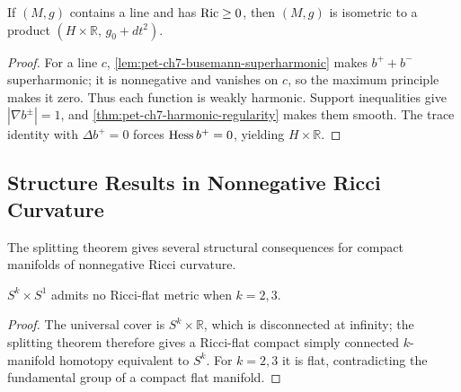 \begin{theorem}
  \label{thm:pet-ch7-splitting-theorem}

  If $(M,g)$ contains a line and has $\operatorname{Ric}\ge0$, then $(M,g)$ is isometric to
  a product $(H\times\mathbb{R},\,g_0+dt^2)$.
\end{theorem}
\begin{proof}
  \sketch
  For a line \(c\), \cref{lem:pet-ch7-busemann-superharmonic} makes \(b^++b^-\) superharmonic; it is nonnegative and vanishes on \(c\), so the maximum principle makes it zero. Thus each function is weakly harmonic. Support inequalities give \(|\nabla b^\pm|=1\), and \cref{thm:pet-ch7-harmonic-regularity} makes them smooth. The trace identity with \(\Delta b^+=0\) forces \(\operatorname{Hess} b^+=0\), yielding \(H\times\mathbb R\).
\end{proof}

\subsection{Structure Results in Nonnegative Ricci Curvature}

The splitting theorem gives several structural consequences for compact
manifolds of nonnegative Ricci curvature.

\begin{corollary}
  \label{cor:pet-ch7-no-ricci-flat-sphere-product}

  $S^k\times S^1$ admits no Ricci-flat metric when $k=2,3$.
\end{corollary}
\begin{proof}
  \sketch
  The universal cover is \(S^k\times\mathbb R\), which is disconnected at infinity; the splitting theorem therefore gives a Ricci-flat compact simply connected \(k\)-manifold homotopy equivalent to \(S^k\). For \(k=2,3\) it is flat, contradicting the fundamental group of a compact flat manifold.
\end{proof}

